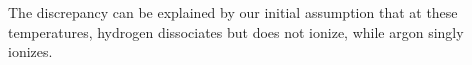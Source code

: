         The discrepancy can be explained by our initial assumption that at these temperatures, hydrogen dissociates but does not ionize, while argon singly ionizes.



